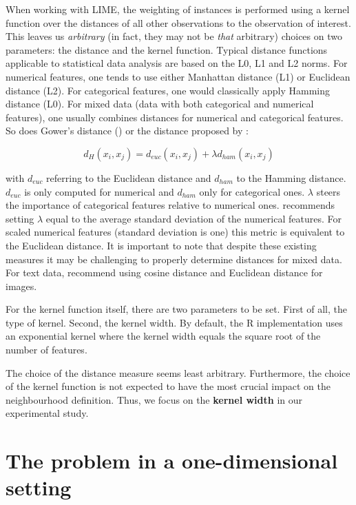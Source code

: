 \documentclass[]{krantz}
\begin{document}
When working with LIME, the weighting of instances is performed using a
kernel function over the distances of all other observations to the
observation of interest. This leaves us \emph{arbitrary} (in fact, they
may not be \emph{that} arbitrary) choices on two parameters: the
distance and the kernel function. Typical distance functions applicable
to statistical data analysis are based on the L0, L1 and L2 norms. For
numerical features, one tends to use either Manhattan distance (L1) or
Euclidean distance (L2). For categorical features, one would classically
apply Hamming distance (L0). For mixed data (data with both categorical
and numerical features), one usually combines distances for numerical
and categorical features. So does Gower's distance
(\citet{gower1971general}) or the distance proposed by
\citet{huang1998kproto}:

\[ d_H(x_i, x_j) = d_{euc}(x_i, x_j) + \lambda d_{ham}(x_i, x_j) \]

with \(d_{euc}\) referring to the Euclidean distance and \(d_{ham}\) to
the Hamming distance. \(d_{euc}\) is only computed for numerical and
\(d_{ham}\) only for categorical ones. \(\lambda\) steers the importance
of categorical features relative to numerical ones.
\citet{huang1998kproto} recommends setting \(\lambda\) equal to the
average standard deviation of the numerical features. For scaled
numerical features (standard deviation is one) this metric is equivalent
to the Euclidean distance. It is important to note that despite these
existing measures it may be challenging to properly determine distances
for mixed data. For text data, \citet{ribeiro2016should} recommend using
cosine distance and Euclidean distance for images.

For the kernel function itself, there are two parameters to be set.
First of all, the type of kernel. Second, the kernel width. By default,
the R implementation uses an exponential kernel where the kernel width
equals the square root of the number of features.

The choice of the distance measure seems least arbitrary. Furthermore,
the choice of the kernel function is not expected to have the most
crucial impact on the neighbourhood definition. Thus, we focus on the
\textbf{kernel width} in our experimental study.

\section{The problem in a one-dimensional setting}\label{id3}
\end{document}

